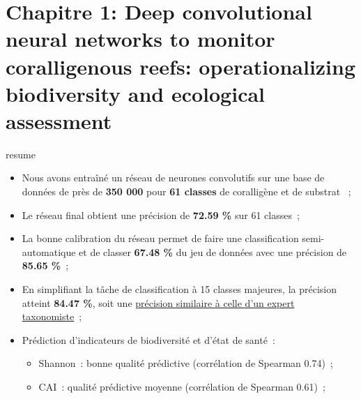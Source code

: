 \chapter[Deep convolutional neural networks to monitor coralligenous reefs: operationalizing biodiversity and ecological assessment]{Chapitre 1: Deep convolutional neural networks to monitor coralligenous reefs: operationalizing biodiversity and ecological assessment} \label{chapitre1-deep}

\pagestyle{main}

\begin{center}
\end{center}

\begin{center}
\begin{colbox}{resume}
  \vspace{-2pt}
{\color{textresume}\small
\begin{itemize}[leftmargin=0in]\itemsep3pt
\item Nous avons entraîné un réseau de neurones convolutifs sur une base de données de près de \textbf{350 000} pour \textbf{61 classes} de coralligène et de substrat ~;
\item Le réseau final obtient une précision de \textbf{72.59 \%} sur 61 classes~;
\item La bonne calibration du réseau permet de faire une classification semi-automatique et de classer \textbf{67.48 \%} du jeu de données avec une précision de \textbf{85.65 \%}~;
\item En simplifiant la tâche de classification à 15 classes majeures, la précision atteint \textbf{84.47 \%}, soit une \underline{précision similaire à celle d'un expert taxonomiste}~;
\item Prédiction d'indicateurs de biodiversité et d'état de santé~:
\begin{itemize}
  \item Shannon~: bonne qualité prédictive (corrélation de Spearman 0.74)~;
  \item CAI~: qualité prédictive moyenne (corrélation de Spearman 0.61)~;
\end{itemize}
\end{itemize}
}
\vspace{-2pt}
\end{colbox}
\end{center}

